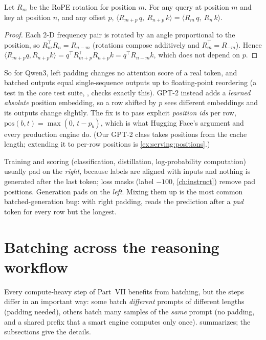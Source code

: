 \begin{proposition}\label{prop:serving:rope}
Let $R_m$ be the RoPE rotation for position $m$. For any query at position $m$ and key at position
$n$, and any offset $p$,
$\langle R_{m+p}\,q,\ R_{n+p}\,k\rangle = \langle R_m\,q,\ R_n\,k\rangle$.
\end{proposition}
\begin{proof}
Each 2-D frequency pair is rotated by an angle proportional to the position, so
$R_m^\top R_n = R_{n-m}$ (rotations compose additively and $R_m^\top=R_{-m}$). Hence
$\langle R_{m+p}q,R_{n+p}k\rangle = q^\top R_{m+p}^\top R_{n+p}k = q^\top R_{n-m}k$, which does not depend on $p$.
\end{proof}

So for Qwen3, left padding changes no attention score of a real token, and batched outputs equal
single-sequence outputs up to floating-point reordering (a test in the core
test suite, , checks exactly this). GPT-2 instead adds a
\emph{learned absolute} position embedding, so a row shifted by $p$ sees different embeddings and
its outputs change slightly. The fix is to pass explicit \emph{position ids} per row,
$\text{pos}(b,t)=\max(0,\,t-p_b)$, which is what Hugging Face's  argument and
every production engine do. (Our GPT-2 class takes positions from the cache length; extending it to
per-row positions is \cref{ex:serving:positions}.)

\begin{pitfall}
Training and scoring (classification, distillation, log-probability computation) usually pad on the
\emph{right}, because labels are aligned with inputs and nothing is generated after the last token;
loss masks (label $-100$, \cref{ch:instruct}) remove pad positions. Generation pads on the \emph{left}.
Mixing them up is the most common batched-generation bug: with right padding,  reads
the prediction after a \emph{pad} token for every row but the longest.
\end{pitfall}

\section{Batching across the reasoning workflow}\label{sec:serving:workflows}

Every compute-heavy step of Part~VII benefits from batching, but the steps differ in an important way:
some batch \emph{different} prompts of different lengths (padding needed), others batch many samples
of the \emph{same} prompt (no padding, and a shared prefix that a smart engine computes only once).
 summarizes; the subsections give the details.

